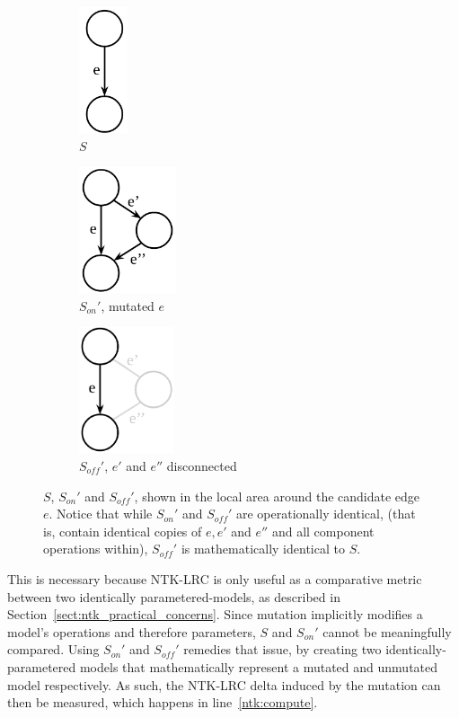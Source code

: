\begin{figure}[ht!]
\centering
\begin{subfigure}{.3\textwidth}
  \centering
  \includegraphics[height=10em]{s}
  \caption{$S$}
\end{subfigure}
\begin{subfigure}{.3\textwidth}
  \centering
  \includegraphics[height=10em]{s_on}
  \caption{$S_{on}'$, mutated $e$}
\end{subfigure}%
\begin{subfigure}{.3\textwidth}
  \centering
  \includegraphics[height=10em]{s_off}
  \caption{$S_{off}'$, $e'$ and $e''$ disconnected}
\end{subfigure}%
\caption[The state of $S$, $S_{on}'$ and $S_{off}'$]{$S$, $S_{on}'$ and $S_{off}'$, shown in the local area around the
candidate edge $e$. Notice that while $S_{on}'$ and $S_{off}'$ are operationally identical,
(that is, contain identical copies of $e, e'$ and $e''$ and all component operations within), $S_{off}'$ is mathematically
identical to $S$.}
\label{fig:ntk_s_models}
\end{figure}

This is necessary because NTK-LRC is only useful as a comparative metric between two identically parametered-models, as
described in Section~\ref{sect:ntk_practical_concerns}. Since mutation implicitly modifies a model's operations and therefore
parameters, $S$ and $S_{on}'$ cannot be meaningfully compared. Using $S_{on}'$ and $S_{off}'$ remedies that issue, by
creating two identically-parametered models that mathematically represent a mutated and unmutated model respectively. As such,
the NTK-LRC delta induced by the mutation can then be measured, which happens in line~\ref{ntk:compute}.


